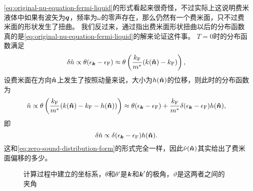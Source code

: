 \eqref{eq:original-nu-equation-fermi-liquid}的形式看起来很奇怪，不过实际上这说明费米液体中如果有波矢为$\vb*{q}$，频率为$\omega$的零声存在，那么仍然有一个费米面，只不过费米面的形状发生了扭曲。
我们反过来，通过指出费米面形状扭曲以后的分布函数真的是\eqref{eq:original-nu-equation-fermi-liquid}的解来论证这件事。%
$T=0$时的分布函数满足
\[
    \var{\hat{n}} \propto \theta(\epsilon_{\vb*{k}} - \epsilon_\text{F}) \approx \theta\left( \frac{k_\text{F}}{m^*} (k(\vu*{n}) - k_\text{F}) \right),
\]
设费米面在方向$\vu*{n}$上发生了按照动量来说，大小为$h(\vu*{n})$的位移，则此时的分布函数为
\[
    \hat{n} \propto \theta\left( \frac{k_\text{F}}{m^*} (k(\vu*{n}) - k_\text{F} - h(\vu*{n})) \right) \approx \theta(\epsilon_{\vb*{k}} - \epsilon_\text{F}) + \frac{k_\text{F}}{m^*} \delta(\epsilon_{\vb*{k}} - \epsilon_\text{F}) h(\vu*{n}),
\]
即
\[
    \var{\hat{n}} \propto \delta(\epsilon_{\vb*{k}} - \epsilon_\text{F}) h(\vu*{n}).
\]
这和\eqref{eq:zero-sound-distribution-form}的形式完全一样，因此$\hat{\nu}(\vu*{n})$其实给出了费米面偏移的多少。

\begin{figure}
    \centering
    
    \caption{计算过程中建立的坐标系，$\theta$和$\theta'$是$\vb*{k}$和$\vb*{k}'$的极角，$\vartheta$是这两者之间的夹角}
\end{figure}

